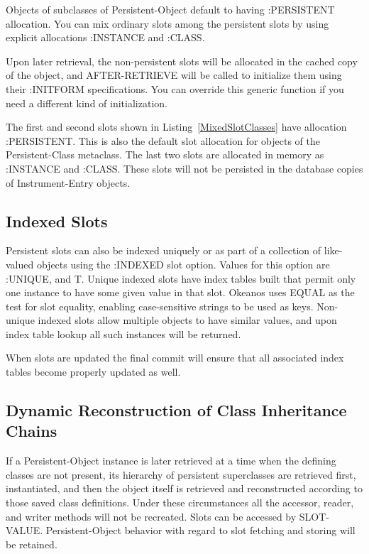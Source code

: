 \documentclass[article,oneside]{memoir}
\begin{document}
Objects of subclasses of {\ttfamily Persistent-Object} default to having {\ttfamily :PERSISTENT} allocation. You can mix ordinary slots among the persistent slots by using explicit allocations {\ttfamily :INSTANCE} and {\ttfamily :CLASS}.

Upon later retrieval, the non-persistent slots will be allocated in the cached copy of the object, and {\ttfamily AFTER-RETRIEVE} will be called to initialize them using their {\ttfamily :INITFORM} specifications. You can override this generic function if you need a different kind of initialization.

The first and second slots shown in Listing~\ref{MixedSlotClasses} have allocation {\ttfamily :PERSISTENT}. This is also the default slot allocation for objects of the {\ttfamily Persistent-Class} metaclass. The last two slots are allocated in memory as {\ttfamily :INSTANCE} and {\ttfamily :CLASS}. These slots will not be persisted in the database copies of {\ttfamily Instrument-Entry} objects. 

\subsection{Indexed Slots}
Persistent slots can also be indexed uniquely or as part of a collection of like-valued objects using the {\ttfamily :INDEXED} slot option. Values for this option are {\ttfamily :UNIQUE}, and {\ttfamily T}. Unique indexed slots have index tables built that permit only one instance to have some given value in that slot. Okeanos uses {\ttfamily EQUAL} as the test for slot equality, enabling case-sensitive strings to be used as keys. Non-unique indexed slots allow multiple objects to have similar values, and upon index table lookup all such instances will be returned.

When slots are updated the final commit will ensure that all associated index tables become properly updated as well.


\subsection{Dynamic Reconstruction of Class Inheritance Chains}
If a {\ttfamily Persistent-Object} instance is later retrieved at a time when the defining classes are not present, its hierarchy of persistent superclasses are retrieved first, instantiated, and then the object itself is retrieved and reconstructed according to those saved class definitions. Under these circumstances all the accessor, reader, and writer methods will not be recreated. Slots can be accessed by {\ttfamily SLOT-VALUE}. {\ttfamily Persistent-Object} behavior with regard to slot fetching and storing will be retained.
\end{document}
